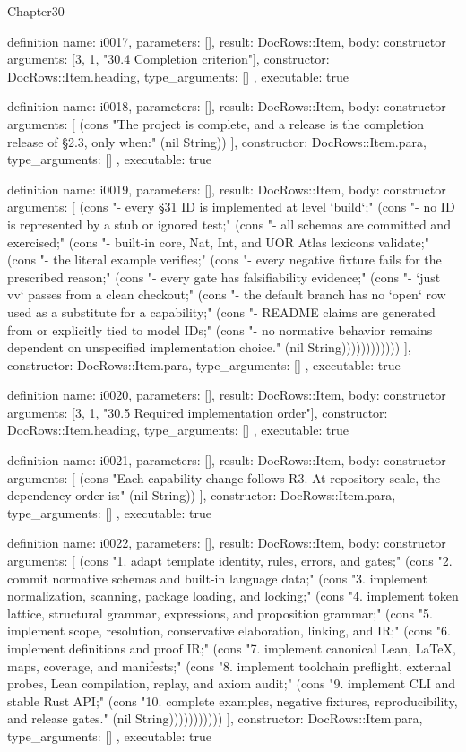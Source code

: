 \begin{lexlean}{Chapter30}
\begin{semanticmodule}
definition{
  name: i0017,
  parameters: [],
  result: DocRows::Item,
  body: constructor{
    arguments: [3, 1, "30.4 Completion criterion"],
    constructor: DocRows::Item.heading,
    type_arguments: []
  },
  executable: true
}

definition{
  name: i0018,
  parameters: [],
  result: DocRows::Item,
  body: constructor{
    arguments: [
      (cons "The project is complete, and a release is the completion release of §2.3, only when:" (nil String))
    ],
    constructor: DocRows::Item.para,
    type_arguments: []
  },
  executable: true
}

definition{
  name: i0019,
  parameters: [],
  result: DocRows::Item,
  body: constructor{
    arguments: [
      (cons "- every §31 ID is implemented at level `build`;" (cons "- no ID is represented by a stub or ignored test;" (cons "- all schemas are committed and exercised;" (cons "- built-in core, Nat, Int, and UOR Atlas lexicons validate;" (cons "- the literal example verifies;" (cons "- every negative fixture fails for the prescribed reason;" (cons "- every gate has falsifiability evidence;" (cons "- `just vv` passes from a clean checkout;" (cons "- the default branch has no `open` row used as a substitute for a capability;" (cons "- README claims are generated from or explicitly tied to model IDs;" (cons "- no normative behavior remains dependent on unspecified implementation choice." (nil String))))))))))))
    ],
    constructor: DocRows::Item.para,
    type_arguments: []
  },
  executable: true
}

definition{
  name: i0020,
  parameters: [],
  result: DocRows::Item,
  body: constructor{
    arguments: [3, 1, "30.5 Required implementation order"],
    constructor: DocRows::Item.heading,
    type_arguments: []
  },
  executable: true
}

definition{
  name: i0021,
  parameters: [],
  result: DocRows::Item,
  body: constructor{
    arguments: [
      (cons "Each capability change follows R3. At repository scale, the dependency order is:" (nil String))
    ],
    constructor: DocRows::Item.para,
    type_arguments: []
  },
  executable: true
}

definition{
  name: i0022,
  parameters: [],
  result: DocRows::Item,
  body: constructor{
    arguments: [
      (cons "1. adapt template identity, rules, errors, and gates;" (cons "2. commit normative schemas and built-in language data;" (cons "3. implement normalization, scanning, package loading, and locking;" (cons "4. implement token lattice, structural grammar, expressions, and proposition grammar;" (cons "5. implement scope, resolution, conservative elaboration, linking, and IR;" (cons "6. implement definitions and proof IR;" (cons "7. implement canonical Lean, LaTeX, maps, coverage, and manifests;" (cons "8. implement toolchain preflight, external probes, Lean compilation, replay, and axiom audit;" (cons "9. implement CLI and stable Rust API;" (cons "10. complete examples, negative fixtures, reproducibility, and release gates." (nil String)))))))))))
    ],
    constructor: DocRows::Item.para,
    type_arguments: []
  },
  executable: true
}


\end{semanticmodule}
\end{lexlean}
